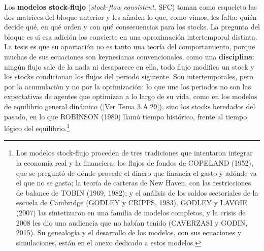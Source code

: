 \documentclass[10pt,a4paper]{article}
\newcommand{\authorfont}[1]{{\fontfamily{EBGaramond-TLF}\selectfont #1}}
\newcounter{anexo}
\begin{document}
Los \textbf{modelos stock-flujo} (\textit{stock-flow consistent}, SFC) toman como esqueleto las dos matrices del bloque anterior y les añaden lo que, como vimos, les falta: quién decide qué, en qué orden y con qué consecuencias para los stocks. La pregunta del bloque es si esa adición los convierte en una aproximación intertemporal distinta. La tesis es que su aportación no es tanto una teoría del comportamiento, porque muchas de sus ecuaciones son keynesianas convencionales, como una \textbf{disciplina}: ningún flujo sale de la nada ni desaparece en ella, todo flujo modifica un stock y los stocks condicionan los flujos del periodo siguiente. Son intertemporales, pero por la acumulación y no por la optimización: lo que une los periodos no son las expectativas de agentes que optimizan a lo largo de su vida, como en los modelos de equilibrio general dinámico ([\authorfont{Ver Tema 3.A.29}]), sino los stocks heredados del pasado, en lo que ROBINSON (1980) llamó tiempo histórico, frente al tiempo lógico del equilibrio.\footnote{%
    Los modelos stock-flujo proceden de tres tradiciones que intentaron integrar la economía real y la financiera: los flujos de fondos de COPELAND (1952), que se preguntó de dónde procede el dinero que financia el gasto y adónde va el que no se gasta; la teoría de carteras de New Haven, con las restricciones de balance de TOBIN (1969, 1982); y el análisis de los saldos sectoriales de la escuela de Cambridge (GODLEY y CRIPPS, 1983). GODLEY y LAVOIE (2007) las sintetizaron en una familia de modelos completos, y la crisis de 2008 les dio una audiencia que no habían tenido (CAVERZASI y GODIN, 2015). Su genealogía y el desarrollo de los modelos, con sus ecuaciones y simulaciones, están en el anexo dedicado a estos modelos.
}
\end{document}
